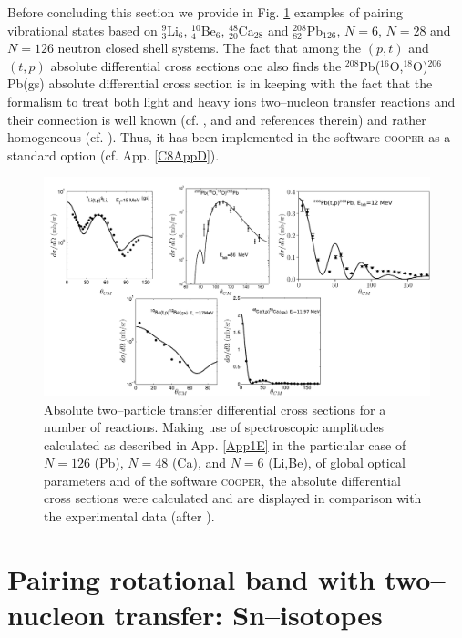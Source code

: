  
 Before concluding this section we provide in Fig. \ref{fig8_2_1} examples of pairing vibrational states based on $^9_3$Li$_6$, $^{10}_4$Be$_6$, $^{48}_{20}$Ca$_{28}$ and $^{208}_{82}$Pb$_{126}$, $N=6$, $N=28$ and $N=126$ neutron closed shell systems. The fact that among the $(p,t)$ and $(t,p)$ absolute differential cross sections one also finds the $^{208}$Pb($^{16}$O,$^{18}$O)$^{206}$Pb(gs) absolute differential cross section is in keeping with the fact that the formalism to treat both light and heavy ions two--nucleon transfer reactions and their connection is well known (cf. \cite{Broglia:04a}, \cite{Bayman:82} and  \cite{Thompson:88} and references therein) and rather homogeneous (cf. \cite{Potel:13b}). Thus, it has been implemented in the software \textsc{cooper} as a standard option (cf. App. \ref{C8AppD}).
   \begin{figure}
   \centerline{\includegraphics*[width=12cm,angle=0]{C8/figsC8/fig8_1_5}}
   	\caption{Absolute two--particle transfer differential cross sections for a number of reactions. Making use of spectroscopic amplitudes calculated as described in App. \ref{App1E} in the particular case of $N=126$ (Pb), $N=48$ (Ca), and $N=6$ (Li,Be), of global optical parameters and of the software \textsc{cooper}, the absolute differential cross sections were calculated and are displayed in comparison with the experimental data (after \cite{Potel:13}).}\label{fig8_2_1}
   \end{figure}
 
 
 
 
 
 
 
 
 
 
 
 
\section[Pairing rotational bands]{Pairing rotational band with two--nucleon transfer: Sn--isotopes}\label{C8S2}


